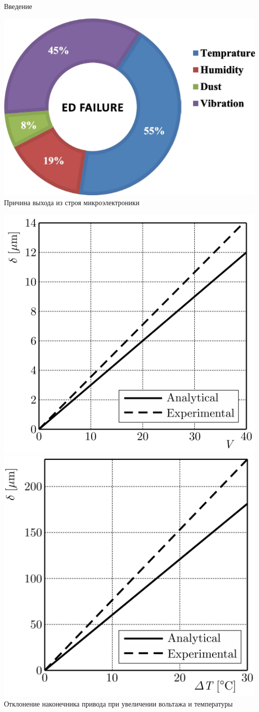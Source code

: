 \begin{frame}{Введение}
	\begin{minipage}{0.39\textwidth}
	\begin{center}
		\includegraphics[width=\linewidth]{pics/EquipmentFailure.png} \\
		Причина выхода из строя микроэлектроники
	\end{center}
	\end{minipage}
	\hfill
	\begin{minipage}{0.59\textwidth}
		\includegraphics[width=0.49\linewidth]{pics/VoltageVariation.png}
		\includegraphics[width=0.49\linewidth]{pics/TemperatureVariation.png} \\
		Отклонение наконечника привода при увеличении вольтажа и температуры
	\end{minipage}
	

\end{frame}
